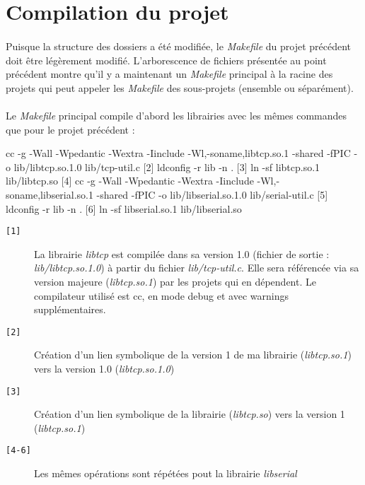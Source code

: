 \documentclass{article}
\begin{document}
    \section{Compilation du projet}
    \paragraph{}
    Puisque la structure des dossiers a été modifiée, le \emph{Makefile} du projet précédent doit être légèrement modifié. L'arborescence de fichiers présentée au point précédent montre qu'il y a maintenant un \emph{Makefile} principal à la racine des projets qui peut appeler les \emph{Makefile} des sous-projets (ensemble ou séparément).

    \paragraph{}
    Le \emph{Makefile} principal compile d'abord les librairies avec les mêmes commandes que pour le projet précédent :
    \begin{verbatimtab}
[1]         cc -g  -Wall -Wpedantic -Wextra -Iinclude -Wl,-soname,libtcp.so.1
                -shared -fPIC -o lib/libtcp.so.1.0 lib/tcp-util.c
[2]         ldconfig -r lib -n .
[3]         ln -sf libtcp.so.1 lib/libtcp.so
[4]         cc -g  -Wall -Wpedantic -Wextra -Iinclude -Wl,-soname,libserial.so.1
                -shared -fPIC -o lib/libserial.so.1.0 lib/serial-util.c
[5]         ldconfig -r lib -n .
[6]         ln -sf libserial.so.1 lib/libserial.so
    \end{verbatimtab}

    \begin{description}
        \item[\texttt{[1]} ] La librairie \emph{libtcp} est compilée dans sa version 1.0 (fichier de sortie : \emph{lib/libtcp.so.1.0}) à partir du fichier \emph{lib/tcp-util.c}. Elle sera référencée via sa version majeure (\emph{libtcp.so.1}) par les projets qui en dépendent. Le compilateur utilisé est cc, en mode debug et avec warnings supplémentaires.
        \item[\texttt{[2]} ] Création d'un lien symbolique de la version 1 de ma librairie (\emph{libtcp.so.1}) vers la version 1.0 (\emph{libtcp.so.1.0})
        \item[\texttt{[3]} ] Création d'un lien symbolique de la librairie (\emph{libtcp.so}) vers la version 1 (\emph{libtcp.so.1})
        \item[\texttt{[4-6]} ] Les mêmes opérations sont répétées pout la librairie \emph{libserial}
    \end{description}
\end{document}
